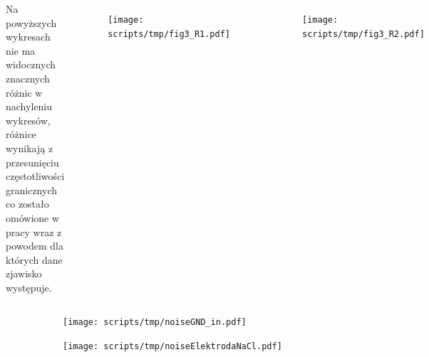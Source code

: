 \begin{frame}[t]

    \begin{block}{\tb}
    \end{block}
    \begin{columns}
        Na powyższych wykresach nie ma widocznych znacznych różnic w nachyleniu wykresów, różnice wynikają z przesunięciu częstotliwości granicznych co zostało omówione w pracy wraz z powodem dla których dane zjawisko występuje. 
            \begin{figure}[H]
                \centering
                \texttt{[image: scripts/tmp/fig3\_R1.pdf]}
            \end{figure}
            \begin{figure}[H]
                \centering
                \texttt{[image: scripts/tmp/fig3\_R2.pdf]}
            \end{figure}
        \end{columns}
        
        \begin{figure}[H]
            \centering
            \begin{subfigure}[b]{0.485\textwidth}
                \centering
                \texttt{[image: scripts/tmp/noiseGND\_in.pdf]}
            \end{subfigure}
            \begin{subfigure}[b]{0.485\textwidth}
                \centering
                \texttt{[image: scripts/tmp/noiseElektrodaNaCl.pdf]}
            \end{subfigure}     
        \end{figure}

\end{frame}



\begin{frame}[t]
    \begin{block}{\tb}
    \end{block}
    
\end{frame}

